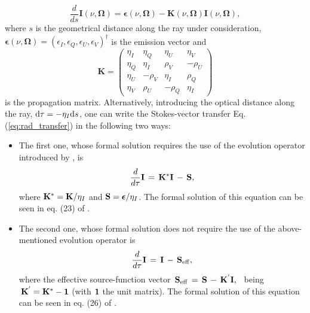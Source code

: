 \documentclass[12pt]{article}
\begin{document}
\begin{equation}
\frac{d}{ds}\mathbf{I}(\nu,\mathbf{\Omega}) =
\bm{\epsilon}(\nu,\mathbf{\Omega}) - \mathbf{K}(\nu,\mathbf{\Omega}) 
\mathbf{I}(\nu,\mathbf{\Omega}),
\label{eq:rad_transfer}
\end{equation}
where $s$ is the geometrical distance along the ray under consideration,
$\bm{\epsilon}(\nu,\mathbf{\Omega})=({\epsilon}_I,{\epsilon}_Q,{\epsilon
}_U,{\epsilon}_V)^{\dag}$ is the emission vector and
\begin{equation}
\mathbf{K} = \left( \begin{array}{cccc}
\eta_I & \eta_Q & \eta_U & \eta_V \\
\eta_Q & \eta_I & \rho_V & -\rho_U \\
\eta_U & -\rho_V & \eta_I & \rho_Q \\
\eta_V & \rho_U & -\rho_Q & \eta_I
\end{array} \right)
\label{eq:propagation}
\end{equation}
is the propagation matrix. Alternatively, introducing the optical distance along the ray,  
${\rm d}{\tau}=-{\eta_I}{\rm d}s$, one can write the Stokes-vector 
transfer Eq. (\ref{eq:rad_transfer}) in the following two ways:

\begin{itemize}

\item The first one, whose formal solution requires the use of the evolution operator introduced by \cite{landi_landi85}, is 
\begin{equation}
{{d}\over{d{\tau}}}{\bf I}\,=\,{\bf K}^{*}
{\bf I}\,-\,{\bf S}, 
\label{eq:rad_transfer_peo}
\end{equation}
where ${\bf K}^{*}={\bf K}/{\eta_I}$ and ${\bf S}=\bm{\epsilon}/{\eta_I}$. 
The formal solution of this equation can be seen in eq. (23) of \cite{trujillo03}.

\item The second one, whose formal solution does not require the use of the above-mentioned evolution operator is \citep[e.g.,][]{rees_delo89}
\begin{equation}
{{d}\over{d{\tau}}}{\bf I}\,=\,{\bf I}\,-\,{\bf S}_{\rm eff},  
\label{eq:rad_transfer_delo}
\end{equation}
where the effective source-function vector
$\,{\bf S}_{\rm eff}\,=\,{\bf S}\,-\,
{\bf K}^{'}{\bf I},\,\,\,$ being $\,{\bf K}^{'}={\bf K}^{*}-{\bf 1}$
(with $\bf 1$ the unit matrix). The formal solution of this equation can be seen in eq. (26) of \cite{trujillo03}.

\end{itemize}
\end{document}
